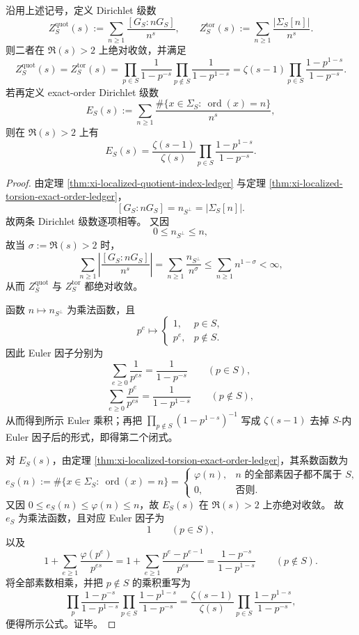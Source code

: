 \begin{theorem}\label{thm:xi-localized-quotient-torsion-zeta-euler-product}
沿用上述记号，定义 Dirichlet 级数
\[
Z_S^{\mathrm{quot}}(s):=\sum_{n\ge 1}\frac{[G_S:nG_S]}{n^s},
\qquad
Z_S^{\mathrm{tor}}(s):=\sum_{n\ge 1}\frac{|\Sigma_S[n]|}{n^s}.
\]
则二者在 \(\Re(s)>2\) 上绝对收敛，并满足
\[
Z_S^{\mathrm{quot}}(s)=Z_S^{\mathrm{tor}}(s)
=
\prod_{p\in S}\frac{1}{1-p^{-s}}
\prod_{p\notin S}\frac{1}{1-p^{1-s}}
=
\zeta(s-1)\prod_{p\in S}\frac{1-p^{1-s}}{1-p^{-s}}.
\]
若再定义 exact-order Dirichlet 级数
\[
E_S(s):=\sum_{n\ge 1}\frac{\#\{x\in\Sigma_S:\ \operatorname{ord}(x)=n\}}{n^s},
\]
则在 \(\Re(s)>2\) 上有
\[
E_S(s)
=
\frac{\zeta(s-1)}{\zeta(s)}
\prod_{p\in S}\frac{1-p^{1-s}}{1-p^{-s}}.
\]
\end{theorem}
\begin{proof}
由定理 \ref{thm:xi-localized-quotient-index-ledger} 与定理
\ref{thm:xi-localized-torsion-exact-order-ledger}，
\[
[G_S:nG_S]=n_{S^\perp}=|\Sigma_S[n]|.
\]
故两条 Dirichlet 级数逐项相等。
又因
\[
0\le n_{S^\perp}\le n,
\]
故当 \(\sigma:=\Re(s)>2\) 时，
\[
\sum_{n\ge 1}\left|\frac{[G_S:nG_S]}{n^s}\right|
=
\sum_{n\ge 1}\frac{n_{S^\perp}}{n^\sigma}
\le
\sum_{n\ge 1}n^{1-\sigma}<\infty,
\]
从而 \(Z_S^{\mathrm{quot}}\) 与 \(Z_S^{\mathrm{tor}}\) 都绝对收敛。

函数 \(n\mapsto n_{S^\perp}\) 为乘法函数，且
\[
p^e\longmapsto
\begin{cases}
1,& p\in S,\\[1mm]
p^e,& p\notin S.
\end{cases}
\]
因此 Euler 因子分别为
\[
\sum_{e\ge 0}\frac{1}{p^{es}}=\frac{1}{1-p^{-s}}
\qquad (p\in S),
\]
\[
\sum_{e\ge 0}\frac{p^e}{p^{es}}=\frac{1}{1-p^{1-s}}
\qquad (p\notin S),
\]
从而得到所示 Euler 乘积；再把 \(\prod_{p\notin S}(1-p^{1-s})^{-1}\) 写成 \(\zeta(s-1)\) 去掉 \(S\)-内 Euler 因子后的形式，即得第二个闭式。

对 \(E_S(s)\)，由定理 \ref{thm:xi-localized-torsion-exact-order-ledger}，其系数函数为
\[
e_S(n):=\#\{x\in\Sigma_S:\ \operatorname{ord}(x)=n\}
=
\begin{cases}
\varphi(n),& \text{\(n\) 的全部素因子都不属于 }S,\\[1mm]
0,& \text{否则}.
\end{cases}
\]
又因 \(0\le e_S(n)\le \varphi(n)\le n\)，故 \(E_S(s)\) 在 \(\Re(s)>2\) 上亦绝对收敛。
故 \(e_S\) 为乘法函数，且对应 Euler 因子为
\[
1
\qquad (p\in S),
\]
以及
\[
1+\sum_{e\ge 1}\frac{\varphi(p^e)}{p^{es}}
=
1+\sum_{e\ge 1}\frac{p^e-p^{e-1}}{p^{es}}
=
\frac{1-p^{-s}}{1-p^{1-s}}
\qquad (p\notin S).
\]
将全部素数相乘，并把 \(p\notin S\) 的乘积重写为
\[
\prod_{p}\frac{1-p^{-s}}{1-p^{1-s}}
\prod_{p\in S}\frac{1-p^{1-s}}{1-p^{-s}}
=
\frac{\zeta(s-1)}{\zeta(s)}
\prod_{p\in S}\frac{1-p^{1-s}}{1-p^{-s}},
\]
便得所示公式。证毕。
\end{proof}

